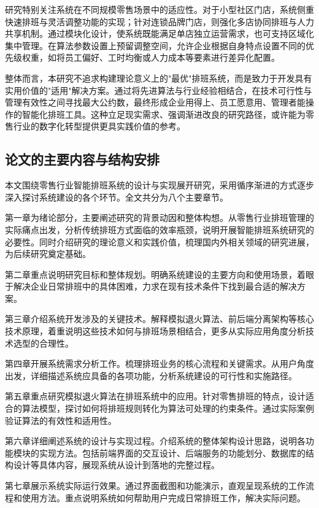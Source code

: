 \documentclass{ctexart}
\begin{document}
研究特别关注系统在不同规模零售场景中的适应性。对于小型社区门店，系统侧重快速排班与灵活调整功能的实现；针对连锁品牌门店，则强化多店协同排班与人力共享机制。通过模块化设计，使系统既能满足单店独立运营需求，也可支持区域化集中管理。在算法参数设置上预留调整空间，允许企业根据自身特点设置不同的优先级权重，如将员工偏好、工时均衡或人力成本等要素进行差异化配置。

整体而言，本研究不追求构建理论意义上的"最优"排班系统，而是致力于开发具有实用价值的"适用"解决方案。通过将先进算法与行业经验相结合，在技术可行性与管理有效性之间寻找最大公约数，最终形成企业用得上、员工愿意用、管理者能操作的智能化排班工具。这种立足现实需求、强调渐进改良的研究路径，或许能为零售行业的数字化转型提供更具实践价值的参考。

\subsection{论文的主要内容与结构安排}
本文围绕零售行业智能排班系统的设计与实现展开研究，采用循序渐进的方式逐步深入探讨系统建设的各个环节。全文共分为八个主要章节。

第一章为绪论部分，主要阐述研究的背景动因和整体构想。从零售行业排班管理的实际痛点出发，分析传统排班方式面临的效率瓶颈，说明开展智能排班系统研究的必要性。同时介绍研究的理论意义和实践价值，梳理国内外相关领域的研究进展，为后续研究奠定基础。

第二章重点说明研究目标和整体规划。明确系统建设的主要方向和使用场景，着眼于解决企业日常排班中的具体困难，力求在现有技术条件下找到最合适的解决方案。

第三章介绍系统开发涉及的关键技术。解释模拟退火算法、前后端分离架构等核心技术原理，着重说明这些技术如何与排班场景相结合，更多从实际应用角度分析技术选型的合理性。

第四章开展系统需求分析工作。梳理排班业务的核心流程和关键需求。从用户角度出发，详细描述系统应具备的各项功能，分析系统建设的可行性和实施路径。

第五章重点研究模拟退火算法在排班系统中的应用。针对零售排班的特点，设计适合的算法模型，探讨如何将排班规则转化为算法可处理的约束条件。通过实际案例验证算法的有效性和适用性。

第六章详细阐述系统的设计与实现过程。介绍系统的整体架构设计思路，说明各功能模块的实现方法。包括前端界面的交互设计、后端服务的功能划分、数据库的结构设计等具体内容，展现系统从设计到落地的完整过程。

第七章展示系统实际运行效果。通过界面截图和功能演示，直观呈现系统的工作流程和使用方法。重点说明系统如何帮助用户完成日常排班工作，解决实际问题。
\end{document}
